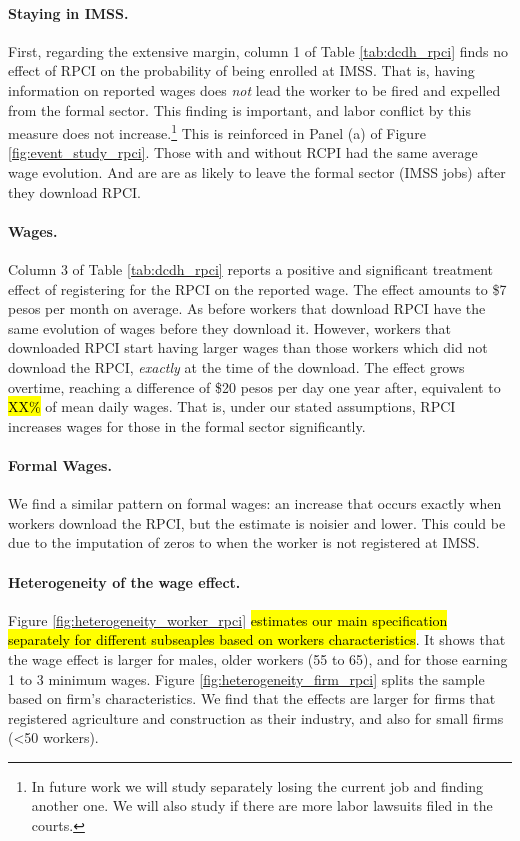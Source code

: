 \documentclass[oneside,11pt]{article}
\begin{document}
\paragraph{Staying in IMSS.} First, regarding the extensive margin, column 1 of Table \ref{tab:dcdh_rpci} finds no effect of RPCI on the probability of being enrolled at IMSS. That is, having information on reported wages does \textit{not} lead the worker to be fired and expelled from the formal sector. This finding is important, and labor conflict by this measure does not increase.\footnote{In future work we will study separately losing the current job and finding another one. We will also study if there are more labor lawsuits filed in the courts.} This is reinforced in Panel (a) of Figure \ref{fig:event_study_rpci}. Those with and without RCPI had the same average wage evolution. And are are as likely to leave the formal sector (IMSS jobs) after they download RPCI.

\paragraph{Wages.} Column 3 of Table \ref{tab:dcdh_rpci} reports a positive and significant treatment effect of registering for the RPCI on the reported wage. The effect amounts to \$7 pesos per month on average. As before workers that download RPCI have the same evolution of wages before they download it. However, workers that downloaded RPCI start having larger wages than those workers which did not download the RPCI, \textit{exactly} at the time of the download. The effect grows overtime, reaching a difference of \$20 pesos per day one year after, equivalent to \hl{XX\%} of mean daily wages. That is, under our stated assumptions, RPCI increases wages for those in the formal sector significantly.

\paragraph{Formal Wages.} We find a similar pattern on formal wages: an increase that occurs exactly when workers download the RPCI, but the estimate is noisier and lower. This could be due to the imputation of zeros to when the worker is not registered at IMSS. 

\paragraph{Heterogeneity of the wage effect.} Figure \ref{fig:heterogeneity_worker_rpci} \hl{estimates our main specification separately for different subseaples based on workers characteristics}. It shows that the wage effect is larger for males, older workers (55 to 65), and for those earning 1 to 3 minimum wages. Figure \ref{fig:heterogeneity_firm_rpci} splits the sample based on firm's characteristics. We find that the effects are larger for firms that registered agriculture and construction as their industry, and also for small firms (<50 workers).
\end{document}
